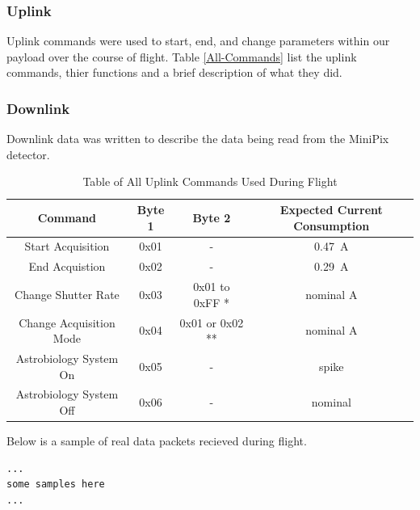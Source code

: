 \subsubsection{Uplink}
\label{sec:Uplink} 
Uplink commands were used to start, end, and change parameters within our payload over the course of flight. 
Table \ref{All-Commands} list the uplink commands, thier functions and a brief description of what they did. 

\subsubsection{Downlink}
\label{sec:Downlink}
Downlink data was written to describe the data being read from the MiniPix detector. 

\begin{table}[h!]
\centering
\caption{Table of All Uplink Commands Used During Flight}
\label{tab:All-Commands}
\bigskip
\begin{tabular}{c|c|c|c}
\hline
\hline
\multicolumn{1}{c|}{\bfseries Command} & \multicolumn{1}{c|}{\bfseries Byte 1} &  \multicolumn{1}{c|}{\bfseries Byte 2} & \multicolumn{1}{c}{\bfseries Expected Current Consumption} \\
\hline
    	Start Acquisition  	& 0x01	& -	 		& \SI{0.47}{\ampere}    \\ \hline
    	End Acquistion 		& 0x02	& -	 		& \SI{0.29}{\ampere}    \\ \hline
    	Change Shutter Rate 	& 0x03 	& 0x01 to 0xFF *	& nominal A 		\\ \hline
	Change Acquisition Mode	& 0x04	& 0x01 or 0x02 **	& nominal A		\\ \hline
	Astrobiology System On	& 0x05	& -			& spike			\\ \hline
	Astrobiology System Off	& 0x06	& -			& nominal		\\ \hline

\end{tabular}
\medskip
\end{table}

Below is a sample of real data packets recieved during flight. 

\lstset{basicstyle=\small, numbers=left, xleftmargin=2em, frame=tb, label = Downlinks, framexleftmargin=1.5em}
\begin{lstlisting}[caption = Sample of downlinked data packets ID: 15667 - 15670.]
...
some samples here
...
\end{lstlisting}
